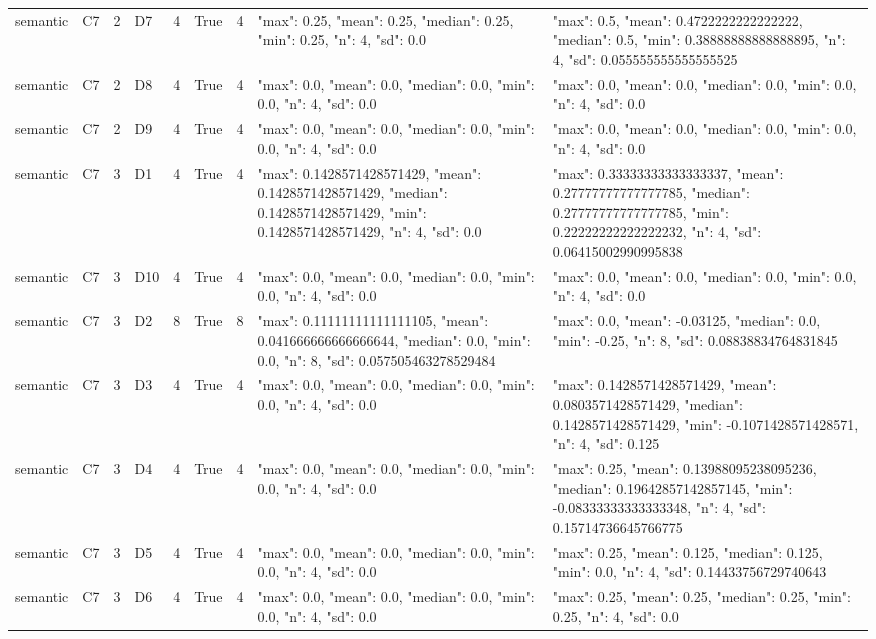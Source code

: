 \begin{tabular}{lllllllll}
semantic & C7 & 2 & D7 & 4 & True & 4 & {"max": 0.25, "mean": 0.25, "median": 0.25, "min": 0.25, "n": 4, "sd": 0.0} & {"max": 0.5, "mean": 0.4722222222222222, "median": 0.5, "min": 0.38888888888888895, "n": 4, "sd": 0.055555555555555525} \\
semantic & C7 & 2 & D8 & 4 & True & 4 & {"max": 0.0, "mean": 0.0, "median": 0.0, "min": 0.0, "n": 4, "sd": 0.0} & {"max": 0.0, "mean": 0.0, "median": 0.0, "min": 0.0, "n": 4, "sd": 0.0} \\
semantic & C7 & 2 & D9 & 4 & True & 4 & {"max": 0.0, "mean": 0.0, "median": 0.0, "min": 0.0, "n": 4, "sd": 0.0} & {"max": 0.0, "mean": 0.0, "median": 0.0, "min": 0.0, "n": 4, "sd": 0.0} \\
semantic & C7 & 3 & D1 & 4 & True & 4 & {"max": 0.1428571428571429, "mean": 0.1428571428571429, "median": 0.1428571428571429, "min": 0.1428571428571429, "n": 4, "sd": 0.0} & {"max": 0.33333333333333337, "mean": 0.27777777777777785, "median": 0.27777777777777785, "min": 0.22222222222222232, "n": 4, "sd": 0.06415002990995838} \\
semantic & C7 & 3 & D10 & 4 & True & 4 & {"max": 0.0, "mean": 0.0, "median": 0.0, "min": 0.0, "n": 4, "sd": 0.0} & {"max": 0.0, "mean": 0.0, "median": 0.0, "min": 0.0, "n": 4, "sd": 0.0} \\
semantic & C7 & 3 & D2 & 8 & True & 8 & {"max": 0.11111111111111105, "mean": 0.041666666666666644, "median": 0.0, "min": 0.0, "n": 8, "sd": 0.057505463278529484} & {"max": 0.0, "mean": -0.03125, "median": 0.0, "min": -0.25, "n": 8, "sd": 0.08838834764831845} \\
semantic & C7 & 3 & D3 & 4 & True & 4 & {"max": 0.0, "mean": 0.0, "median": 0.0, "min": 0.0, "n": 4, "sd": 0.0} & {"max": 0.1428571428571429, "mean": 0.0803571428571429, "median": 0.1428571428571429, "min": -0.1071428571428571, "n": 4, "sd": 0.125} \\
semantic & C7 & 3 & D4 & 4 & True & 4 & {"max": 0.0, "mean": 0.0, "median": 0.0, "min": 0.0, "n": 4, "sd": 0.0} & {"max": 0.25, "mean": 0.13988095238095236, "median": 0.19642857142857145, "min": -0.08333333333333348, "n": 4, "sd": 0.15714736645766775} \\
semantic & C7 & 3 & D5 & 4 & True & 4 & {"max": 0.0, "mean": 0.0, "median": 0.0, "min": 0.0, "n": 4, "sd": 0.0} & {"max": 0.25, "mean": 0.125, "median": 0.125, "min": 0.0, "n": 4, "sd": 0.14433756729740643} \\
semantic & C7 & 3 & D6 & 4 & True & 4 & {"max": 0.0, "mean": 0.0, "median": 0.0, "min": 0.0, "n": 4, "sd": 0.0} & {"max": 0.25, "mean": 0.25, "median": 0.25, "min": 0.25, "n": 4, "sd": 0.0} \\

\end{tabular}
